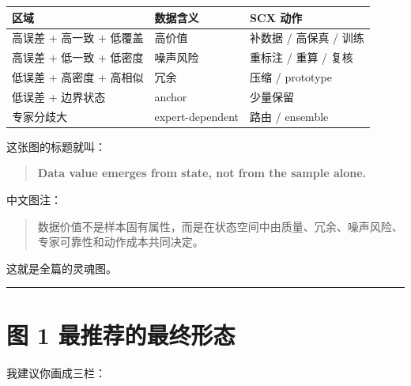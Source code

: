 \documentclass[
  12pt,
]{ctexart}
\begin{document}
\begin{longtable}[]{@{}
  >{\raggedright\arraybackslash}p{}
  >{\raggedright\arraybackslash}p{}
  >{\raggedright\arraybackslash}p{}@{}}
\toprule\noalign{}
\begin{minipage}[b]{\linewidth}\raggedright
区域
\end{minipage} & \begin{minipage}[b]{\linewidth}\raggedright
数据含义
\end{minipage} & \begin{minipage}[b]{\linewidth}\raggedright
SCX 动作
\end{minipage} \\
\midrule\noalign{}
\endhead
\bottomrule\noalign{}
\endlastfoot
高误差 + 高一致 + 低覆盖 & 高价值 & 补数据 / 高保真 / 训练 \\
高误差 + 低一致 + 低密度 & 噪声风险 & 重标注 / 重算 / 复核 \\
低误差 + 高密度 + 高相似 & 冗余 & 压缩 / prototype \\
低误差 + 边界状态 & anchor & 少量保留 \\
专家分歧大 & expert-dependent & 路由 / ensemble \\
\end{longtable}

这张图的标题就叫：

\begin{quote}
\textbf{Data value emerges from state, not from the sample alone.}
\end{quote}

中文图注：

\begin{quote}
数据价值不是样本固有属性，而是在状态空间中由质量、冗余、噪声风险、专家可靠性和动作成本共同决定。
\end{quote}

这就是全篇的灵魂图。

\begin{center}\rule{0.5\linewidth}{0.5pt}\end{center}

\section{图 1
最推荐的最终形态}\label{ux56fe-1-ux6700ux63a8ux8350ux7684ux6700ux7ec8ux5f62ux6001}

我建议你画成三栏：
\end{document}
